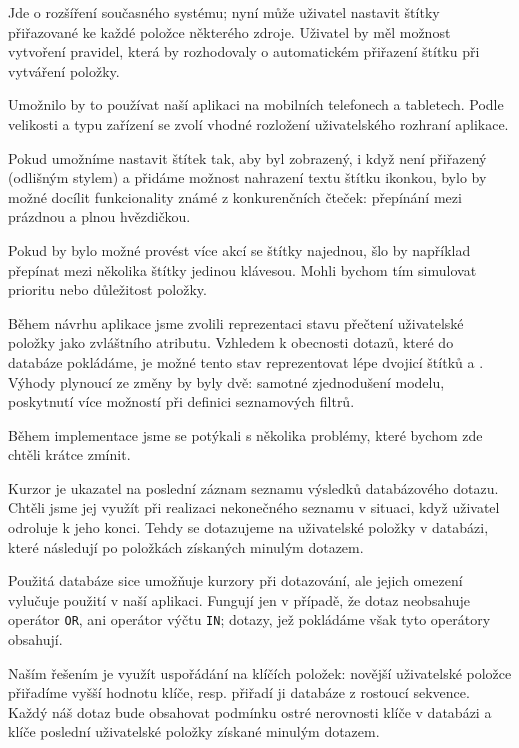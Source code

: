 Jde o rozšíření současného systému; nyní může uživatel nastavit štítky přiřazované ke každé položce některého zdroje.
Uživatel by měl možnost vytvoření pravidel, která by rozhodovaly o automatickém přiřazení štítku při vytváření položky.

Umožnilo by to používat naší aplikaci na mobilních telefonech a tabletech.
Podle velikosti a typu zařízení se zvolí vhodné rozložení uživatelského rozhraní aplikace.
 
Pokud umožníme nastavit štítek tak, aby byl zobrazený, i když není přiřazený (odlišným stylem) a přidáme možnost nahrazení textu štítku ikonkou, bylo by možné docílit funkcionality známé z konkurenčních čteček: přepínání mezi prázdnou a plnou hvězdičkou.

Pokud by bylo možné provést více akcí se štítky najednou, šlo by například přepínat mezi několika štítky jedinou klávesou.
Mohli bychom tím simulovat prioritu nebo důležitost položky.

Během návrhu aplikace jsme zvolili reprezentaci stavu přečtení uživatelské položky jako zvláštního atributu.
Vzhledem k obecnosti dotazů, které do databáze pokládáme, je možné tento stav reprezentovat lépe dvojicí štítků  a .
Výhody plynoucí ze změny by byly dvě: samotné zjednodušení modelu, poskytnutí více možností při definici seznamových filtrů.


Během implementace jsme se potýkali s několika problémy, které bychom zde chtěli krátce zmínit.


Kurzor je ukazatel na poslední záznam seznamu výsledků databázového dotazu.
Chtěli jsme jej využít při realizaci nekonečného seznamu v situaci, když uživatel odroluje k jeho konci.
Tehdy se dotazujeme na uživatelské položky v databázi, které následují po položkách získaných minulým dotazem.

Použitá databáze sice umožňuje kurzory při dotazování, ale jejich omezení vylučuje použití v naší aplikaci.
Fungují jen v případě, že dotaz neobsahuje operátor \verb|OR|, ani operátor výčtu \verb|IN|; dotazy, jež pokládáme však tyto operátory obsahují. 

Naším řešením je využít uspořádání na klíčích položek: novější uživatelské položce přiřadíme vyšší hodnotu klíče, resp. přiřadí ji databáze z rostoucí sekvence.
Každý náš dotaz bude obsahovat podmínku ostré nerovnosti klíče v databázi a klíče poslední uživatelské položky získané minulým dotazem.

